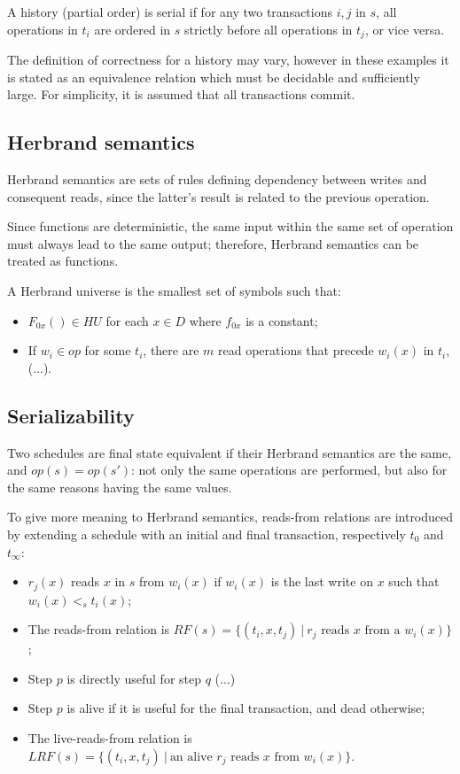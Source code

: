 A history (partial order) is serial if for any two transactions $i, j$ in $s$, all operations in $t_i$ are ordered in $s$ strictly before all operations in $t_j$, or vice versa.

The definition of correctness for a history may vary, however in these examples it is stated as an equivalence relation which must be decidable and sufficiently large. For simplicity, it is assumed that all transactions commit.

\subsection{Herbrand semantics}
Herbrand semantics are sets of rules defining dependency between writes and consequent reads, since the latter's result is related to the previous operation.

Since functions are deterministic, the same input within the same set of operation must always lead to the same output; therefore, Herbrand semantics can be treated as functions.

A Herbrand universe is the smallest set of symbols such that:
\begin{itemize}
	\item $F_{0x}() \in HU$ for each $x \in D$ where $f_{0x}$ is a constant;
	\item If $w_i \in op$ for some $t_i$, there are $m$ read operations that precede $w_i(x)$ in $t_i$, (...).
\end{itemize}

\subsection{Serializability}
Two schedules are final state equivalent if their Herbrand semantics are the same, and $op(s) = op(s')$: not only the same operations are performed, but also for the same reasons having the same values.

To give more meaning to Herbrand semantics, reads-from relations are introduced by extending a schedule with an initial and final transaction, respectively $t_0$ and $t_{\infty}$:
\begin{itemize}
	\item $r_j(x)$ reads $x$ in $s$ from $w_i(x)$ if $w_i(x)$ is the last write on $x$ such that $w_i(x) <_s t_i(x)$;
	\item The reads-from relation is $RF(s) = \{(t_i, x, t_j)\ |\ r_j \text{ reads } x \text{ from a } w_i(x)\}$;
	\item Step $p$ is directly useful for step $q$ (...)
	\item Step $p$ is alive if it is useful for the final transaction, and dead otherwise;
	\item The live-reads-from relation is $LRF(s) = \{(t_i, x, t_j)\ |\ \text{an alive } r_j \text{ reads } x \text{ from } w_i(x)\}$.
\end{itemize}


